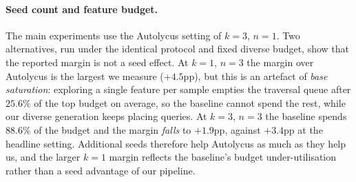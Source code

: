\documentclass[sigconf,anonymous,review]{acmart}
\begin{document}
\paragraph{Seed count and feature budget.} The main experiments use the Autolycus setting of
$k{=}3$, $n{=}1$. Two alternatives, run under the identical protocol and fixed diverse budget, show
that the reported margin is not a seed effect. At $k{=}1$, $n{=}3$ the margin over Autolycus is the
largest we measure ($+4.5$pp), but this is an artefact of \emph{base saturation}: exploring a single
feature per sample empties the traversal queue after $25.6\%$ of the top budget on average, so the
baseline cannot spend the rest, while our diverse generation keeps placing queries. At $k{=}3$,
$n{=}3$ the baseline spends $88.6\%$ of the budget and the margin \emph{falls} to $+1.9$pp, against
$+3.4$pp at the headline setting. Additional seeds therefore help Autolycus as much as they help us,
and the larger $k{=}1$ margin reflects the baseline's budget under-utilisation rather than a seed
advantage of our pipeline.

\end{document}
